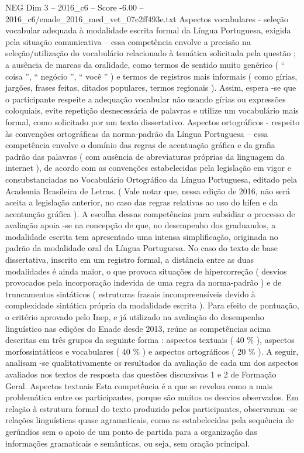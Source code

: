 \begin{textsample}{NEG Dim 3 – 2016\_c6 – Score -6.00 – 2016\_c6/enade\_2016\_med\_vet\_07e2ff493e.txt}
Aspectos vocabulares - seleção vocabular adequada à modalidade escrita formal da Língua Portuguesa, exigida pela situação comunicativa – essa competência envolve a precisão na seleção/utilização do vocabulário relacionado à temática solicitada pela questão ; a ausência de marcas da oralidade, como termos de sentido muito genérico ( “ coisa ”, “ negócio ”, “ você ” ) e termos de registros mais informais ( como gírias, jargões, frases feitas, ditados populares, termos regionais ).
Assim, espera -se que o participante respeite a adequação vocabular não usando gírias ou expressões coloquiais, evite repetição desnecessária de palavras e utilize um vocabulário mais formal, como solicitado por um texto dissertativo.
Aspectos ortográficos - respeito às convenções ortográficas da norma-padrão da Língua Portuguesa – essa competência envolve o domínio das regras de acentuação gráfica e da grafia padrão das palavras ( com ausência de abreviaturas próprias da linguagem da internet ), de acordo com as convenções estabelecidas pela legislação em vigor e consubstanciadas no Vocabulário Ortográfico da Língua Portuguesa, editado pela Academia Brasileira de Letras. ( Vale notar que, nessa edição de 2016, não será aceita a legislação anterior, no caso das regras relativas ao uso do hífen e da acentuação gráfica ).
A escolha dessas competências para subsidiar o processo de avaliação apoia -se na concepção de que, no desempenho dos graduandos, a modalidade escrita tem apresentado uma intensa simplificação, originada no padrão da modalidade oral da Língua Portuguesa.
No caso do texto de base dissertativa, inscrito em um registro formal, a distância entre as duas modalidades é ainda maior, o que provoca situações de hipercorreção ( desvios provocados pela incorporação indevida de uma regra da norma-padrão ) e de truncamentos sintáticos ( estruturas frasais incompreensíveis devido à complexidade sintática própria da modalidade escrita ).
Para efeito de pontuação, o critério aprovado pelo Inep, e já utilizado na avaliação do desempenho linguístico nas edições do Enade desde 2013, reúne as competências acima descritas em três grupos da seguinte forma : aspectos textuais ( 40 \% ), aspectos morfossintáticos e vocabulares ( 40 \% ) e aspectos ortográficos ( 20 \% ).
A seguir, analisam -se qualitativamente os resultados da avaliação de cada um dos aspectos avaliados nos textos de resposta das questões discursivas 1 e 2 de Formação Geral.
Aspectos textuais Esta competência é a que se revelou como a mais problemática entre os participantes, porque são muitos os desvios observados.
Em relação à estrutura formal do texto produzido pelos participantes, observaram -se relações linguísticas quase agramaticais, como as estabelecidas pela sequência de gerúndios sem o apoio de um ponto de partida para a organização das informações gramaticais e semânticas, ou seja, sem oração principal.

\end{textsample}
